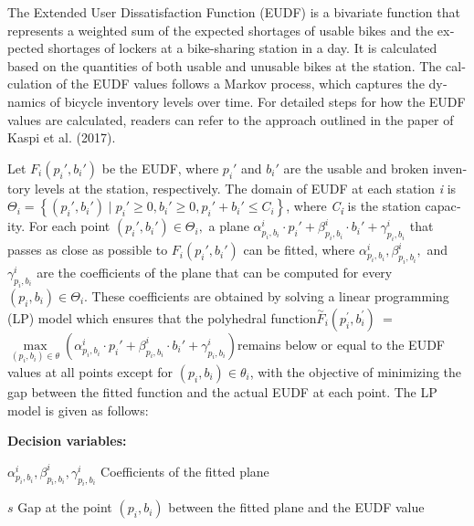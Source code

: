 \documentclass[
  english,
]{article}
\begin{document}
\begin{otherlanguage}{english}
\protect{}\label{p0735}
The Extended User Dissatisfaction Function (EUDF) is a bivariate function that represents a weighted
sum of the expected shortages of usable bikes and the expected shortages of lockers at a
bike-sharing station in a day. It is calculated based on the quantities of both usable and unusable
bikes at the station. The calculation of the EUDF values follows a Markov process, which captures
the dynamics of bicycle inventory levels over time. For detailed steps for how the EUDF values are
calculated, readers can refer to the approach outlined in the paper of Kaspi et al. (2017).

\protect{}\label{p0740}
Let \(F_{i}\left( {p_{i}',b_{i}'} \right)\) be the EUDF, where \(p_{i}'\) and \(b_{i}'\) are the
usable and broken inventory levels at the station, respectively. The domain of EUDF at each station
\emph{i} is
\(\Theta_{i} = \left\{ {\left( {p_{i}',b_{i}'} \right) \mid p_{i}' \geq 0,b_{i}' \geq 0,p_{i}' + b_{i}' \leq C_{i}} \right\}\),
where \emph{C\textsubscript{i}} is the station capacity. For each point
\(\left( {p_{i}',b_{i}'} \right) \in \Theta_{i},\) a plane
\(\alpha_{p_{i},b_{i}}^{i} \cdot p_{i}' + \beta_{p_{i},b_{i}}^{i} \cdot b_{i}' + \gamma_{p_{i},b_{i}}^{i}\)
that passes as close as possible to \(F_{i}\left( {p_{i}',b_{i}'} \right)\) can be fitted, where
\(\alpha_{p_{i},b_{i}}^{i},\beta_{p_{i},b_{i}}^{i},\) and \(\gamma_{p_{i},b_{i}}^{i}\) are the
coefficients of the plane that can be computed for every
\(\left( {p_{i},b_{i}} \right) \in \Theta_{i}\). These coefficients are obtained by solving a linear
programming (LP) model which ensures that the polyhedral
function\({\overset{\sim}{F}}_{i}\left( {p_{i}^{'},b_{i}^{'}} \right)\)~=~\(\max\limits_{{({p_{i},b_{i}})} \in \theta}\left( {\alpha_{p_{i},b_{i}}^{i} \cdot p_{i}' + \beta_{p_{i},b_{i}}^{i} \cdot b_{i}' + \gamma_{p_{i},b_{i}}^{i}} \right)\)remains
below or equal to the EUDF values at all points except for
\(\left( {p_{i},b_{i}} \right) \in \theta_{i}\), with the objective of minimizing the gap between
the fitted function and the actual EUDF at each point. The LP model is given as follows:

\protect{}\label{p0745}
\textbf{Decision variables:}

\protect{}\label{p0750}
\(\alpha_{p_{i},b_{i}}^{i},\beta_{p_{i},b_{i}}^{i},\)\(\gamma_{p_{i},b_{i}}^{i}\) Coefficients of
the fitted plane

\protect{}\label{p0755}
\(s\) Gap at the point \(\left( {p_{i},b_{i}} \right)\) between the fitted plane and the EUDF value


\end{otherlanguage}
\end{document}
